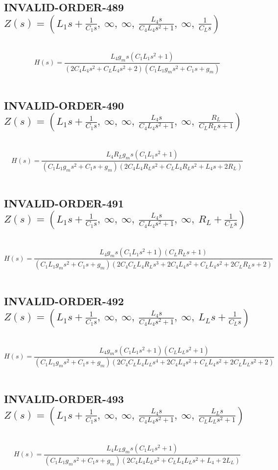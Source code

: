 \documentclass{article}
\begin{document}
\subsection{INVALID-ORDER-489 $Z(s) = \left( L_{1} s + \frac{1}{C_{1} s}, \  \infty, \  \infty, \  \frac{L_{4} s}{C_{4} L_{4} s^{2} + 1}, \  \infty, \  \frac{1}{C_{L} s}\right)$ } \ 
\textbf{\[H(s) = \frac{L_{4} g_{m} s \left(C_{1} L_{1} s^{2} + 1\right)}{\left(2 C_{4} L_{4} s^{2} + C_{L} L_{4} s^{2} + 2\right) \left(C_{1} L_{1} g_{m} s^{2} + C_{1} s + g_{m}\right)}\] } \ 
\subsection{INVALID-ORDER-490 $Z(s) = \left( L_{1} s + \frac{1}{C_{1} s}, \  \infty, \  \infty, \  \frac{L_{4} s}{C_{4} L_{4} s^{2} + 1}, \  \infty, \  \frac{R_{L}}{C_{L} R_{L} s + 1}\right)$ } \ 
\textbf{\[H(s) = \frac{L_{4} R_{L} g_{m} s \left(C_{1} L_{1} s^{2} + 1\right)}{\left(C_{1} L_{1} g_{m} s^{2} + C_{1} s + g_{m}\right) \left(2 C_{4} L_{4} R_{L} s^{2} + C_{L} L_{4} R_{L} s^{2} + L_{4} s + 2 R_{L}\right)}\] } \ 
\subsection{INVALID-ORDER-491 $Z(s) = \left( L_{1} s + \frac{1}{C_{1} s}, \  \infty, \  \infty, \  \frac{L_{4} s}{C_{4} L_{4} s^{2} + 1}, \  \infty, \  R_{L} + \frac{1}{C_{L} s}\right)$ } \ 
\textbf{\[H(s) = \frac{L_{4} g_{m} s \left(C_{1} L_{1} s^{2} + 1\right) \left(C_{L} R_{L} s + 1\right)}{\left(C_{1} L_{1} g_{m} s^{2} + C_{1} s + g_{m}\right) \left(2 C_{4} C_{L} L_{4} R_{L} s^{3} + 2 C_{4} L_{4} s^{2} + C_{L} L_{4} s^{2} + 2 C_{L} R_{L} s + 2\right)}\] } \ 
\subsection{INVALID-ORDER-492 $Z(s) = \left( L_{1} s + \frac{1}{C_{1} s}, \  \infty, \  \infty, \  \frac{L_{4} s}{C_{4} L_{4} s^{2} + 1}, \  \infty, \  L_{L} s + \frac{1}{C_{L} s}\right)$ } \ 
\textbf{\[H(s) = \frac{L_{4} g_{m} s \left(C_{1} L_{1} s^{2} + 1\right) \left(C_{L} L_{L} s^{2} + 1\right)}{\left(C_{1} L_{1} g_{m} s^{2} + C_{1} s + g_{m}\right) \left(2 C_{4} C_{L} L_{4} L_{L} s^{4} + 2 C_{4} L_{4} s^{2} + C_{L} L_{4} s^{2} + 2 C_{L} L_{L} s^{2} + 2\right)}\] } \ 
\subsection{INVALID-ORDER-493 $Z(s) = \left( L_{1} s + \frac{1}{C_{1} s}, \  \infty, \  \infty, \  \frac{L_{4} s}{C_{4} L_{4} s^{2} + 1}, \  \infty, \  \frac{L_{L} s}{C_{L} L_{L} s^{2} + 1}\right)$ } \ 
\textbf{\[H(s) = \frac{L_{4} L_{L} g_{m} s \left(C_{1} L_{1} s^{2} + 1\right)}{\left(C_{1} L_{1} g_{m} s^{2} + C_{1} s + g_{m}\right) \left(2 C_{4} L_{4} L_{L} s^{2} + C_{L} L_{4} L_{L} s^{2} + L_{4} + 2 L_{L}\right)}\] } \ 
\end{document}
